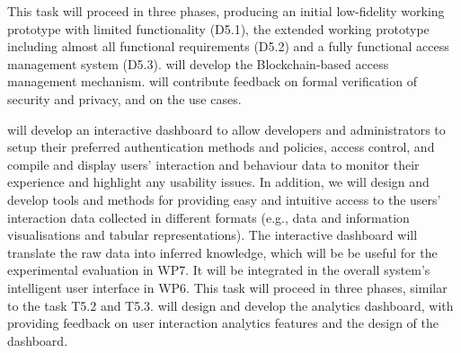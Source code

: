 \begin{Workpackage}{\thewpno}
\begin{Task}
This task will proceed in three phases, producing an initial low-fidelity working prototype with limited functionality (D5.1), the extended working prototype including almost all functional requirements (D5.2) and a fully functional access management system (D5.3). \COGNIshort{} will develop the Blockchain-based access management mechanism. \USTANshort{} will contribute feedback on formal verification of security and privacy, and \SOPRAshort{} on the use cases.
\end{Task}


\begin{Task}
\TaskResults{%
\ref{del:auth1},
\ref{del:auth2},
\ref{del:auth3}
}
\TaskHeader{}

\theTask will develop an interactive dashboard to allow developers and administrators to setup their preferred authentication methods and policies, access control, and compile and display users’ interaction and behaviour data to monitor their experience and highlight any usability issues. In addition, we will design and develop tools and methods for providing easy and intuitive access to the users’ interaction data collected in different formats (e.g., data and information visualisations and tabular representations). %
The interactive dashboard will translate the raw data into inferred knowledge, which will be be useful for the experimental evaluation in WP7. It will be integrated in the overall system's intelligent user interface in WP6. This task will proceed in three phases, similar to the task T5.2 and T5.3.
\COGNIshort{} will design and develop the analytics dashboard, with \FRQshort{} providing feedback on user interaction analytics features and the design of the dashboard.
\end{Task}


\end{Workpackage}
